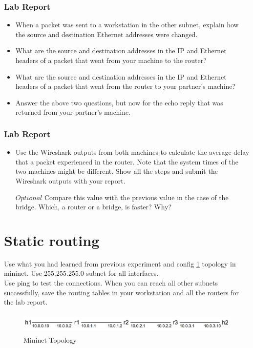 \documentclass[10pt,a4paper]{article}
\numberwithin{equation}{section}
\numberwithin{figure}{section}
\numberwithin{table}{section}
\begin{document}
    \subsubsection*{ Lab Report}
    \begin{itemize}
    	\setlength{\itemindent}{0pt}
    	\item When a packet was sent to a workstation in the other subnet, explain how the source and destination Ethernet addresses were changed.
    	\item What are the source and destination addresses in the IP and Ethernet headers of a packet that went from your machine to the router?
    	\item What are the source and destination addresses in the IP and Ethernet headers of a packet that went from the router to your partner’s machine?
    	\item Answer the above two questions, but now for the echo reply that was returned from your partner’s machine.
    \end{itemize}

\subsubsection*{ Lab Report}
\begin{itemize}
	\setlength{\itemindent}{0pt}
	\item Use the Wireshark outputs from both machines to calculate the average delay that a packet experienced in the router. Note that the system times of the two machines might be different. Show all the steps and submit the Wireshark outputs with your report.
	\item [\(Optional\)] \indent  Compare this value with the previous value in the case of the bridge. Which, a router or a bridge, is faster? Why?
\end{itemize}

\section{Static routing}
  Use what you had learned from previous experiment and config \ref{fig:linearRouters} topology in mininet. Use 255.255.255.0 subnet for all interfaces. \\
  Use ping to test the connections. When you can reach all other subnets successfully, save the routing tables in your workstation and all the routers for the lab report.

\begin{figure}[H]
	\centering
	\includegraphics[height=30pt]{img/fig2.png}
	\caption{Mininet Topology}
	\label{fig:linearRouters}
\end{figure}
\end{document}
